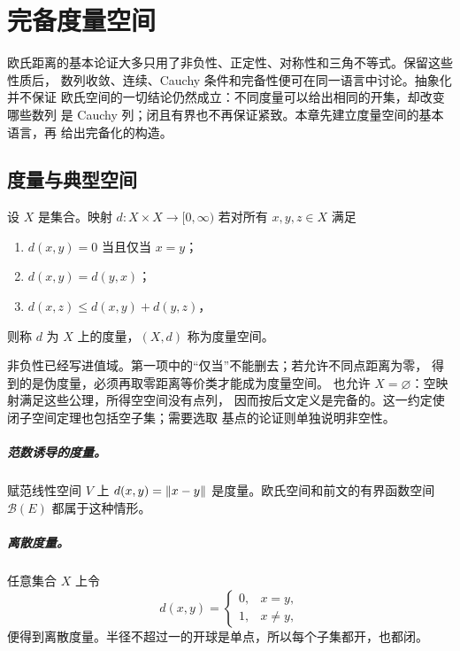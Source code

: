 \chapter{完备度量空间}
\label{chap:complete-metric-spaces}

欧氏距离的基本论证大多只用了非负性、正定性、对称性和三角不等式。保留这些性质后，
数列收敛、连续、Cauchy 条件和完备性便可在同一语言中讨论。抽象化并不保证
欧氏空间的一切结论仍然成立：不同度量可以给出相同的开集，却改变哪些数列
是 Cauchy 列；闭且有界也不再保证紧致。本章先建立度量空间的基本语言，再
给出完备化的构造。

\section{度量与典型空间}

\begin{definition}[度量空间]
设 \(X\) 是集合。映射 \(d:X\times X\to[0,\infty)\) 若对所有
\(x,y,z\in X\) 满足
\begin{enumerate}[label=\textup{(\roman*)}]
 \item \(d(x,y)=0\) 当且仅当 \(x=y\)；
 \item \(d(x,y)=d(y,x)\)；
 \item \(d(x,z)\le d(x,y)+d(y,z)\)，
\end{enumerate}
则称 \(d\) 为 \(X\) 上的度量，\((X,d)\) 称为度量空间。
\end{definition}

非负性已经写进值域。第一项中的“仅当”不能删去；若允许不同点距离为零，
得到的是伪度量，必须再取零距离等价类才能成为度量空间。
也允许 \(X=\varnothing\)：空映射满足这些公理，所得空空间没有点列，
因而按后文定义是完备的。这一约定使闭子空间定理也包括空子集；需要选取
基点的论证则单独说明非空性。

\paragraph{范数诱导的度量。}
赋范线性空间 \(V\) 上
\(d(x,y)=\left\lVert x-y\right\rVert\) 是度量。欧氏空间和前文的有界函数空间
\(\mathcal B(E)\) 都属于这种情形。

\paragraph{离散度量。}
任意集合 \(X\) 上令
\[
 d(x,y)=
 \begin{cases}0,&x=y,\\1,&x\ne y,
 \end{cases}
\]
便得到离散度量。半径不超过一的开球是单点，所以每个子集都开，也都闭。

